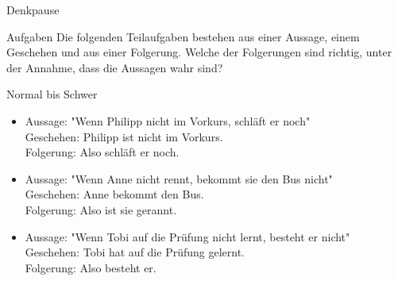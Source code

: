 {
	\begin{frame}{Denkpause}
		\begin{alertblock}{Aufgaben}
			Die folgenden Teilaufgaben bestehen aus einer Aussage, einem Geschehen und aus einer Folgerung. Welche der Folgerungen sind richtig, unter der Annahme, 
			dass die Aussagen wahr sind?
		\end{alertblock}
		\begin{block}{Normal bis Schwer}
			\begin{itemize}
				\item Aussage: "Wenn Philipp nicht im Vorkurs, schläft er noch"\\
				Geschehen: Philipp ist nicht im Vorkurs.\\
				Folgerung: Also schläft er noch.
				\item Aussage: "Wenn Anne nicht rennt, bekommt sie den Bus nicht"\\
				Geschehen: Anne bekommt den Bus.\\
				Folgerung: Also ist sie gerannt.
				\item Aussage: "Wenn Tobi auf die Prüfung nicht lernt, besteht er nicht"\\
				Geschehen: Tobi hat auf die Prüfung gelernt.\\
				Folgerung: Also besteht er.
			\end{itemize}
		\end{block}
	\end{frame}
}
	
